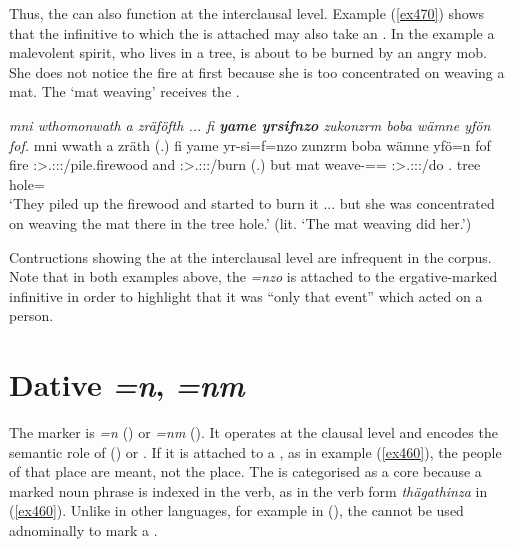 Thus, the   can also function at the interclausal level. Example (\ref{ex470}) shows that the infinitive to which the  is attached may also take an . In the example a malevolent spirit, who lives in a tree, is about to be burned by an angry mob. She does not notice the fire at first because she is too concentrated on weaving a mat. The `mat weaving' receives the .

\begin{exe}
	\ex \emph{mni wthomonwath a zräföfth ... fi \textbf{yame yrsifnzo} zukonzrm boba wämne yfön fof.}
	\gll mni wwath a zräth (.) fi yame yr-si=f=nzo zunzrm boba wämne yfö=n fof\\
	fire \Stpl:\Sbj>\Tsg.\F:\Obj:\Pst:\Ipfv/pile.firewood and \Stpl:\Sbj>\Tsg.\F:\Obj:\Irr:\Pfv/burn (.) but mat weave-\Nmlz=\Erg={\Only} \Stsg:\Sbj>\Tsg.\F:\Obj:\Pst:\Dur/do \Med.{\Abl} tree hole={\Loc} {\Emph}\\
	\trans `They piled up the firewood and started to burn it ... but she was concentrated on weaving the mat there in the tree hole.' (lit. `The mat weaving did her.')\\
	\label{ex470}
\end{exe}

Contructions showing the  at the interclausal level are infrequent in the corpus. Note that in both examples above, the   \emph{=nzo} is attached to the ergative-marked infinitive in order to highlight that it was ``only that event'' which acted on a person.

\section{Dative \emph{=n}, \emph{=nm}} \label{datcase}

The   marker is \emph{=n} (\Sg) or \emph{=nm} (\Nsg). It operates at the clausal level and encodes the semantic role of ()  or . If it is attached to a , as in example (\ref{ex460}), the people of that place are meant, not the place. The  is categorised as a core  because a  marked noun phrase is indexed in the verb, as in the verb form \emph{thägathinza} in (\ref{ex460}). Unlike in other  languages, for example in  (\citealt{Carroll:Ngkolmpu}), the   cannot be used adnominally to mark a .
 
